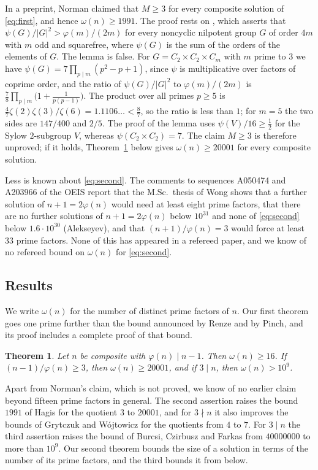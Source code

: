 \documentclass[11pt,reqno]{amsart}
\numberwithin{equation}{section}
\theoremstyle{plain}
\newtheorem{theorem}{Theorem}[section]
\theoremstyle{definition}
\theoremstyle{remark}
\begin{document}
In a preprint, Norman \cite{Nor21} claimed that $M\ge3$ for every composite solution
of \eqref{eq:first}, and hence $\omega(n)\ge1991$. The proof rests on
\cite[Lemma~2.1]{Nor21}, which asserts that
$\psi(G)/|G|^2>\varphi(m)/(2m)$ for every noncyclic nilpotent group
$G$ of order $4m$ with $m$ odd and squarefree, where $\psi(G)$ is the
sum of the orders of the elements of $G$. The lemma is false. For
$G=C_2\times C_2\times C_m$ with $m$ prime to $3$ we have
$\psi(G)=7\prod_{p\mid m}(p^2-p+1)$, since $\psi$ is multiplicative
over factors of coprime order, and the ratio of $\psi(G)/|G|^2$ to
$\varphi(m)/(2m)$ is $\frac78\prod_{p\mid m}\bigl(1+\frac1{p(p-1)}\bigr)$.
The product over all primes $p\ge5$ is
$\frac47\zeta(2)\zeta(3)/\zeta(6)=1.1106\ldots<\frac87$, so the ratio
is less than $1$; for $m=5$ the two sides are $147/400$ and $2/5$. The
proof of the lemma uses $\psi(V)/16\ge\frac12$ for the Sylow
$2$-subgroup $V$, whereas $\psi(C_2\times C_2)=7$. The claim $M\ge3$
is therefore unproved; if it holds, Theorem~\ref{thm:first} below gives
$\omega(n)\ge20001$ for every composite solution.

Less is known about \eqref{eq:second}. The comments to
sequences A050474 and A203966 of the OEIS \cite{OEIS} report that the
M.Sc.\ thesis of Wong \cite{Won97} shows that a further solution of
$n+1=2\varphi(n)$ would need at least eight prime factors, that there
are no further solutions of $n+1=2\varphi(n)$ below $10^{31}$ and none
of \eqref{eq:second} below $1.6\cdot10^{30}$ (Alekseyev), and that
$(n+1)/\varphi(n)=3$ would force at least $33$ prime factors. None of
this has appeared in a refereed paper, and we know of no refereed bound
on $\omega(n)$ for \eqref{eq:second}.

\subsection{Results}
We write $\omega(n)$ for the number of distinct prime factors of $n$.
Our first theorem goes one prime further than the bound announced by
Renze and by Pinch, and its proof includes a complete proof of that
bound.

\begin{theorem}\label{thm:first}
Let $n$ be composite with $\varphi(n)\mid n-1$. Then $\omega(n)\ge16$.
If $(n-1)/\varphi(n)\ge3$, then $\omega(n)\ge20001$, and if $3\mid n$,
then $\omega(n)>10^9$.
\end{theorem}

Apart from Norman's claim, which is not proved, we know of no earlier
claim beyond fifteen prime factors in general. The second assertion raises the bound $1991$
of Hagis for the quotient $3$ to $20001$, and for $3\nmid n$ it also
improves the bounds of Grytczuk and W\'ojtowicz for the quotients from
$4$ to $7$. For $3\mid n$ the third
assertion raises the bound of Burcsi, Czirbusz and Farkas from
$40000000$ to more than $10^9$. Our second theorem bounds the size of a solution in terms of the
number of its prime factors, and the third bounds it from below.
\end{document}
